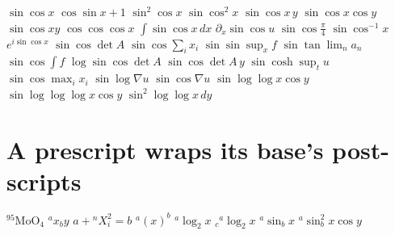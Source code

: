 \documentclass{article}
\begin{document}
$\sin\cos x$ $\cos\sin x+1$ $\sin^2\cos x$ $\sin\cos^2 x$ $\sin\cos x\,y$ $\sin\cos x\cos y$ $\sin\cos xy$ $\cos\cos\cos x$
$\int\sin\cos x\,dx$ $\partial_x\sin\cos u$ $\sin\cos\frac{\pi}{4}$ $\sin\cos^{-1}x$ $e^{i\sin\cos x}$
$\sin\cos\det A$ $\sin\cos\sum_i x_i$ $\sin\sin\sup_x f$ $\sin\tan\lim_n a_n$ $\sin\cos\int f$ $\log\sin\cos\det A$
$\sin\cos\det A\,y$ $\sin\cosh\sup_t u$ $\sin\cos\max_i x_i$
$\sin\log\nabla u$ $\sin\cos\nabla u$ $\sin\log\log x\cos y$ $\sin\log\log\log x\cos y$ $\sin^2\log\log x\,dy$

\section{A prescript wraps its base's post-scripts}
${}^{95}\mathrm{MoO}_4$ ${}^a x_b y$ $a+{}^{n}\!X_{i}^{2}=b$ ${}^a(x)^b$
${}^a\log_2 x$ ${}_c{}^a\log_2 x$ ${}^a\sin_b x$ ${}^a\sin^2_b x\cos y$
\end{document}
